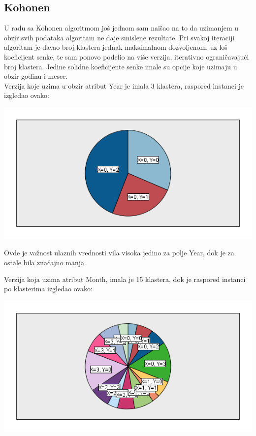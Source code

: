 \documentclass[
	12pt,			
	openright,		
	oneside,			
	a4paper,		
	english,			
	]{article}
\begin{document}
\subsection{Kohonen}
U radu sa Kohonen algoritmom još jednom sam naišao na to da uzimanjem u obzir svih podataka algoritam ne daje smislene rezultate. Pri svakoj iteraciji algoritam je davao broj klastera jednak maksimalnom dozvoljenom, uz loš koeficijent senke, te sam ponovo podelio na više verzija, iterativno ograničavajući broj klastera.
Jedine solidne koeficijente senke imale su opcije koje uzimaju u obzir godinu i mesec.\\
Verzija koje uzima u obzir atribut Year je imala 3 klastera, raspored instanci je izgledao ovako: 
 \begin{center}
    \includegraphics[width = 15cm]{Slike/KohonenYear.png}
    \end{center}

Ovde je važnost ulaznih vrednosti vila visoka jedino za polje Year, dok je za ostale bila značajno manja.

\newpage
Verzija koja uzima atribut Month, imala je 15 klastera, dok je raspored instanci po klasterima izgledao ovako:


 \begin{center}
    \includegraphics[width = 15cm]{Slike/KohonenMonth.png}
    \end{center}
\end{document}
